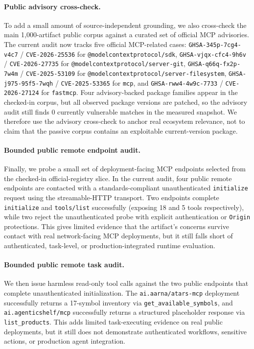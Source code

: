 \documentclass[10pt]{article}
\begin{document}
\paragraph{Public advisory cross-check.}
To add a small amount of source-independent grounding, we also cross-check the main 1{,}000-artifact public corpus against a curated set of official MCP advisories. The current audit now tracks five official MCP-related cases: \texttt{GHSA-345p-7cg4-v4c7} / \texttt{CVE-2026-25536} for \texttt{@modelcontextprotocol/sdk}, \texttt{GHSA-vjqx-cfc4-9h6v} / \texttt{CVE-2026-27735} for \texttt{@modelcontextprotocol/server-git}, \texttt{GHSA-q66q-fx2p-7w4m} / \texttt{CVE-2025-53109} for \texttt{@modelcontextprotocol/server-filesystem}, \texttt{GHSA-j975-95f5-7wqh} / \texttt{CVE-2025-53365} for \texttt{mcp}, and \texttt{GHSA-rww4-4w9c-7733} / \texttt{CVE-2026-27124} for \texttt{fastmcp}. Four advisory-backed package families appear in the checked-in corpus, but all observed package versions are patched, so the advisory audit still finds 0 currently vulnerable matches in the measured snapshot. We therefore use the advisory cross-check to anchor real ecosystem relevance, not to claim that the passive corpus contains an exploitable current-version package.


\paragraph{Bounded public remote endpoint audit.}
Finally, we probe a small set of deployment-facing MCP endpoints selected from the checked-in official-registry slice. In the current audit, four public remote endpoints are contacted with a standards-compliant unauthenticated \texttt{initialize} request using the streamable-HTTP transport. Two endpoints complete \texttt{initialize} and \texttt{tools/list} successfully (exposing 18 and 5 tools respectively), while two reject the unauthenticated probe with explicit authentication or \texttt{Origin} protections. This gives limited evidence that the artifact's concerns survive contact with real network-facing MCP deployments, but it still falls short of authenticated, task-level, or production-integrated runtime evaluation.

\paragraph{Bounded public remote task audit.}
We then issue harmless read-only tool calls against the two public endpoints that complete unauthenticated initialization. The \texttt{ai.aarna/atars-mcp} deployment successfully returns a 17-symbol inventory via \texttt{get\_available\_symbols}, and \texttt{ai.agenticshelf/mcp} successfully returns a structured placeholder response via \texttt{list\_products}. This adds limited task-executing evidence on real public deployments, but it still does not demonstrate authenticated workflows, sensitive actions, or production agent integration.
\end{document}
